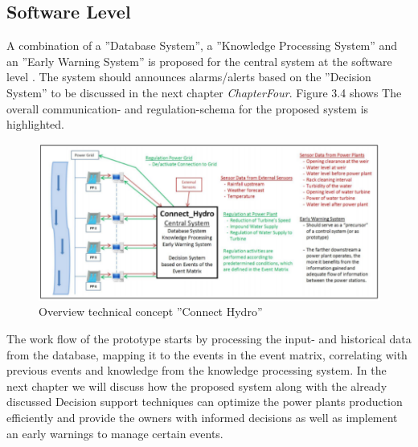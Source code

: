 \subsection{Software Level}
A combination of a ”Database System”, a ”Knowledge Processing System” and an ”Early Warning System” is proposed for the central system at the software level \cite{SEIT2017}. The system should announces alarms/alerts based on the ”Decision System” to be discussed in the next chapter \textit{ChapterFour}. Figure 3.4 shows The overall communication- and regulation-schema for the proposed system is highlighted.
\begin{figure}[H]
\centering
\includegraphics[scale=0.5]{Images/ConnectHydro.png}
\caption[Overview technical concept ”Connect Hydro”]{Overview technical concept ”Connect Hydro” \cite{SEIT2017}}
\end{figure}
The work flow of the prototype starts by processing the input- and historical data from the database, mapping it to the
events in the event matrix, correlating with previous events and knowledge from the knowledge processing system. In the next chapter we will discuss how the proposed system along with the already discussed Decision support techniques can optimize the power plants production efficiently and provide the owners with informed decisions as well as implement an early warnings to manage certain events.